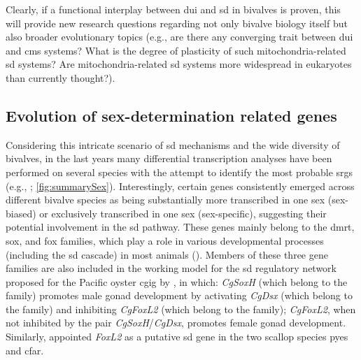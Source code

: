 Clearly, if a functional interplay between \gls{dui} and \gls{sd} in bivalves is proven, this will provide new research questions regarding not only bivalve biology itself but also broader evolutionary topics (e.g., are there any converging trait between \gls{dui} and \gls{cms} systems? What is the degree of plasticity of such mitochondria-related \gls{sd} systems? Are mitochondria-related \gls{sd} systems more widespread in eukaryotes than currently thought?).

\subsection{Evolution of sex-determination related genes}
Considering this intricate scenario of \gls{sd} mechanisms and the wide diversity of bivalves, in the last years many differential transcription analyses have been performed on several species with the attempt to identify the most probable \glspl{srg} (e.g., ; \cref{fig:summarySex}). Interestingly, certain genes consistently emerged across different bivalve species as being substantially more transcribed in one sex (sex-biased) or exclusively transcribed in one sex (sex-specific), suggesting their potential involvement in the \gls{sd} pathway. These genes mainly belong to the \gls{dmrt}, \gls{sox}, and \gls{fox} families, which play a role in various developmental processes (including the \gls{sd} cascade) in most animals (). Members of these three gene families are also included in the working model for the \gls{sd} regulatory network proposed for the Pacific oyster \gls{cgig} by , in which: \textit{CgSoxH} (which belong to the  family) promotes male gonad development by activating \textit{CgDsx} (which belong to the  family) and inhibiting \textit{CgFoxL2} (which belong to the  family); \textit{CgFoxL2}, when not inhibited by the pair \textit{CgSoxH}/\textit{CgDsx}, promotes female gonad development. Similarly,  appointed \textit{FoxL2} as a putative \gls{sd} gene in the two scallop species \gls{pyes} and \gls{cfar}.
